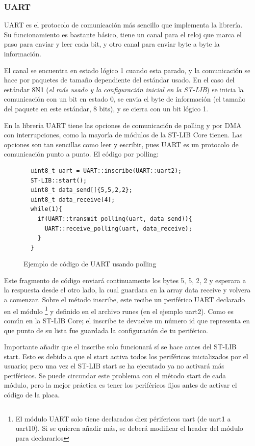 \documentclass{report}
\begin{document}
\subsubsection{UART}
UART es el protocolo de comunicación más sencillo que implementa la librería. Su funcionamiento es bastante básico, tiene un canal para el reloj que marca el paso para enviar y leer cada bit, y otro canal para enviar byte a byte la información. 
\par
El canal se encuentra en estado lógico 1 cuando esta parado, y la comunicación se hace por paquetes de tamaño dependiente del estándar usado. En el caso del estándar 8N1 (\textit{el más usado y la configuración inicial en la ST-LIB}) se inicia la comunicación con un bit en estado 0, se envia el byte de información (el tamaño del paquete en este estándar, 8 bits), y se cierra con un bit lógico 1. 
\par \vspace{0.3cm}
En la librería UART tiene las opciones de comunicación de polling y por DMA con interrupciones, como la mayoría de módulos de la ST-LIB Core tienen. Las opciones son tan sencillas como leer y escribir, pues UART es un protocolo de comunicación punto a punto. El código por polling: 
\begin{figure}[h]
\begin{lstlisting}
  uint8_t uart = UART::inscribe(UART::uart2);
  ST-LIB::start();
  uint8_t data_send[]{5,5,2,2};
  uint8_t data_receive[4];
  while(1){
    if(UART::transmit_polling(uart, data_send)){
      UART::receive_polling(uart, data_receive);
    }
  }
\end{lstlisting}
\caption{Ejemplo de código de UART usando polling}
  \label{UARTwPollingcode}
\end{figure}
\par \vspace{0.3cm}
Este fragmento de código enviará continuamente los bytes 5, 5, 2, 2 y esperara a la respuesta desde el otro lado, la cual guardara en la array data receive y volvera a comenzar. Sobre el método inscribe, este recibe un periférico UART declarado en el módulo \footnote{El módulo UART solo tiene declarados diez périfericos uart (de uart1 a uart10). Si se quieren añadir más, se deberá modificar el header del módulo para declararlos} y definido en el archivo runes (en el ejemplo uart2). Como es común en la ST-LIB Core; el inscribe te devuelve un número id que representa en que punto de su lista fue guardada la configuración de tu periférico. 
\par
Importante añadir que el inscribe solo funcionará sí se hace antes del ST-LIB start. Esto es debido a que el start activa todos los periféricos inicializados por el usuario; pero una vez el ST-LIB start se ha ejecutado ya no activará más periféricos. Se puede circundar este problema con el método start de cada módulo, pero la mejor práctica es tener los periféricos fijos antes de activar el código de la placa. 
\end{document}
